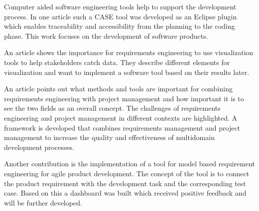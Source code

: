     Computer aided software engineering tools help to support the development process. In one article such a CASE tool was developed as an Eclipse plugin which enables traceability and accessibility from the planning to the coding phase. This work focuses on the development of software products.~\cite{6976693}

    An article shows the importance for requirements engineering to use visualization tools to help stakeholders catch data. They describe different elements for visualization and want to implement a software tool based on their results later.~\cite{RICHTER2020271}

    An article points out what methods and tools are important for combining requirements engineering with project management and how important it is to see the two fields as an overall concept. The challenges of requirements engineering and project management in different contexts are highlighted. A framework is developed that combines requirements management and project management to increase the quality and effectiveness of multidomain development processes.~\cite{Jorma2014}

    Another contribution is the implementation of a tool for model based requirement engineering for agile product development. The concept of the tool is to connect the product requirement with the development task and the corresponding test case. Based on this a dashboard was built which received positive feedback and will be further developed.~\cite{WINDISCH2022550}



